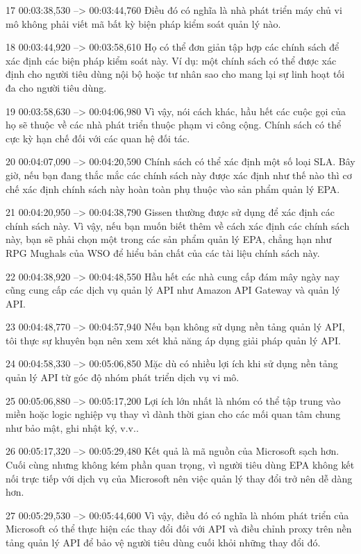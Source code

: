17
00:03:38,530 --> 00:03:44,760
Điều đó có nghĩa là nhà phát triển máy chủ vi mô không phải viết mã bất kỳ biện pháp kiểm soát quản lý nào.

18
00:03:44,920 --> 00:03:58,610
Họ có thể đơn giản tập hợp các chính sách để xác định các biện pháp kiểm soát này.  Ví dụ: một chính sách có thể được xác định cho người tiêu dùng nội bộ hoặc tư nhân sao cho mang lại sự linh hoạt tối đa cho người tiêu dùng.

19
00:03:58,630 --> 00:04:06,980
Vì vậy, nói cách khác, hầu hết các cuộc gọi của họ sẽ thuộc về các nhà phát triển thuộc phạm vi công cộng.  Chính sách có thể cực kỳ hạn chế đối với các quan hệ đối tác.

20
00:04:07,090 --> 00:04:20,590
Chính sách có thể xác định một số loại SLA.  Bây giờ, nếu bạn đang thắc mắc các chính sách này được xác định như thế nào thì cơ chế xác định chính sách này hoàn toàn phụ thuộc vào sản phẩm quản lý EPA.

21
00:04:20,950 --> 00:04:38,790
Gissen thường được sử dụng để xác định các chính sách này.  Vì vậy, nếu bạn muốn biết thêm về cách xác định các chính sách này, bạn sẽ phải chọn một trong các sản phẩm quản lý EPA, chẳng hạn như RPG Mughals của WSO để hiểu bản chất của các tài liệu chính sách này.

22
00:04:38,920 --> 00:04:48,550
Hầu hết các nhà cung cấp đám mây ngày nay cũng cung cấp các dịch vụ quản lý API như Amazon API Gateway và quản lý API.

23
00:04:48,770 --> 00:04:57,940
Nếu bạn không sử dụng nền tảng quản lý API, tôi thực sự khuyên bạn nên xem xét khả năng áp dụng giải pháp quản lý API.

24
00:04:58,330 --> 00:05:06,850
Mặc dù có nhiều lợi ích khi sử dụng nền tảng quản lý API từ góc độ nhóm phát triển dịch vụ vi mô.

25
00:05:06,880 --> 00:05:17,200
Lợi ích lớn nhất là nhóm có thể tập trung vào miền hoặc logic nghiệp vụ thay vì dành thời gian cho các mối quan tâm chung như bảo mật, ghi nhật ký, v.v..

26
00:05:17,320 --> 00:05:29,480
Kết quả là mã nguồn của Microsoft sạch hơn.  Cuối cùng nhưng không kém phần quan trọng, vì người tiêu dùng EPA không kết nối trực tiếp với dịch vụ của Microsoft nên việc quản lý thay đổi trở nên dễ dàng hơn.

27
00:05:29,530 --> 00:05:44,600
Vì vậy, điều đó có nghĩa là nhóm phát triển của Microsoft có thể thực hiện các thay đổi đối với API và điều chỉnh proxy trên nền tảng quản lý API để bảo vệ người tiêu dùng cuối khỏi những thay đổi đó.

